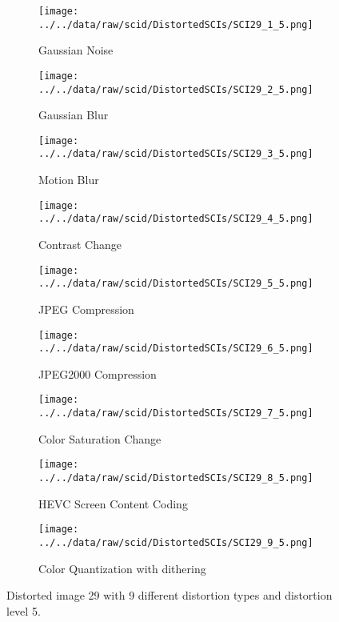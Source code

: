 \begin{figure}[h!]
    \centering
    \begin{subfigure}[b]{0.3\textwidth}
        \texttt{[image: ../../data/raw/scid/DistortedSCIs/SCI29\_1\_5.png]}
        \caption{Gaussian Noise}
        \label{fig:distortion_type_1}
    \end{subfigure}
    \hfill
    \begin{subfigure}[b]{0.3\textwidth}
        \texttt{[image: ../../data/raw/scid/DistortedSCIs/SCI29\_2\_5.png]}
        \caption{Gaussian Blur}
        \label{fig:distortion_type_2}
    \end{subfigure}
    \hfill
    \begin{subfigure}[b]{0.3\textwidth}
        \texttt{[image: ../../data/raw/scid/DistortedSCIs/SCI29\_3\_5.png]}
        \caption{Motion Blur}
        \label{fig:distortion_type_3}
    \end{subfigure}
    \newline
    \begin{subfigure}[b]{0.3\textwidth}
        \texttt{[image: ../../data/raw/scid/DistortedSCIs/SCI29\_4\_5.png]}
        \caption{Contrast Change}
        \label{fig:distortion_type_4}
    \end{subfigure}
    \hfill
    \begin{subfigure}[b]{0.3\textwidth}
        \texttt{[image: ../../data/raw/scid/DistortedSCIs/SCI29\_5\_5.png]}
        \caption{JPEG Compression}
        \label{fig:distortion_type_5}
    \end{subfigure}
    \hfill
    \begin{subfigure}[b]{0.3\textwidth}
        \texttt{[image: ../../data/raw/scid/DistortedSCIs/SCI29\_6\_5.png]}
        \caption{JPEG2000 Compression}
        \label{fig:distortion_type_6}
    \end{subfigure}
    \newline
    \begin{subfigure}[b]{0.3\textwidth}
        \texttt{[image: ../../data/raw/scid/DistortedSCIs/SCI29\_7\_5.png]}
        \caption{Color Saturation Change}
        \label{fig:distortion_type_7}
    \end{subfigure}
    \hfill
    \begin{subfigure}[b]{0.3\textwidth}
        \texttt{[image: ../../data/raw/scid/DistortedSCIs/SCI29\_8\_5.png]}
        \caption{HEVC Screen Content Coding}
        \label{fig:distortion_type_8}
    \end{subfigure}
    \hfill
    \begin{subfigure}[b]{0.3\textwidth}
        \texttt{[image: ../../data/raw/scid/DistortedSCIs/SCI29\_9\_5.png]}
        \caption{Color Quantization with dithering}
        \label{fig:distortion_type_9}
    \end{subfigure}
    \caption{Distorted image 29 with 9 different distortion types and distortion level 5.}
    \label{fig:distortion_types}
\end{figure}

